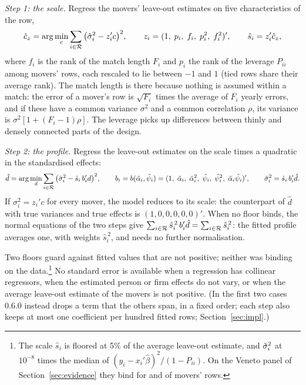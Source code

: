 \emph{Step 1: the scale.} Regress the movers' leave-out estimates on five characteristics of the row,
\begin{equation}\label{eq:scale}
\hat c_z=\arg\min_c\sum_{i\in\mathcal{R}}\big(\hat\sigma_i^2-z_i'c\big)^2,\qquad z_i=(1,\;p_i,\;f_i,\;p_i^2,\;f_i^2)',\qquad \hat s_i=z_i'\hat c_z ,
\end{equation}
where $f_i$ is the rank of the match length $F_i$ and $p_i$ the rank of the leverage $P_{ii}$ among movers'
rows, each rescaled to lie between $-1$ and $1$ (tied rows share their average rank). The match length is there
because nothing is assumed within a match: the error of a mover's row is $\sqrt{F_i}$ times the average of $F_i$
yearly errors, and if these have a common variance $\sigma^2$ and a common correlation $\rho$, its variance is
$\sigma^2[1+(F_i-1)\rho]$. The leverage picks up differences between thinly and densely connected parts of the
design.

\emph{Step 2: the profile.} Regress the leave-out estimates on the scale times a quadratic in the standardised
effects:
\begin{equation}\label{eq:profile}
\hat d=\arg\min_d\sum_{i\in\mathcal{R}}\big(\hat\sigma_i^2-\hat s_i\,b_i'd\big)^2,\qquad
b_i=b(\tilde\alpha_i,\tilde\psi_i)=(1,\;\tilde\alpha_i,\;\tilde\alpha_i^2,\;\tilde\psi_i,\;\tilde\psi_i^2,\;\tilde\alpha_i\tilde\psi_i)',\qquad
\tilde\sigma_i^2=\hat s_i\,b_i'\hat d .
\end{equation}
If $\sigma_i^2=z_i'c$ for every mover, the model reduces to its scale: the counterpart of $\hat d$ with
true variances and true effects is $(1,0,0,0,0,0)'$. When no floor binds, the normal equations of the two steps
give $\sum_{i\in\mathcal{R}}\hat s_i^{\,2}\,b_i'\hat d=\sum_{i\in\mathcal{R}}\hat s_i^{\,2}$: the fitted profile averages one,
with weights $\hat s_i^{\,2}$, and needs no further normalisation.

Two floors guard against fitted values that are not positive; neither was binding on the data.\footnote{The
scale $\hat s_i$ is floored at 5\% of the average leave-out estimate, and $\tilde\sigma_i^2$ at $10^{-8}$ times the median
of $(y_i-x_i'\hat\beta)^2/(1-P_{ii})$. On the Veneto panel of Section~\ref{sec:evidence} they bind for
 and  of movers' rows.} No standard error is available when a regression
has collinear regressors, when the estimated person or firm effects do not vary, or when the average leave-out
estimate of the movers is not positive. (In the first two cases \fevc{} 0.6.0 instead drops a term that the others
span, in a fixed order; each step also keeps at most one coefficient per hundred fitted rows;
Section~\ref{sec:impl}.)

